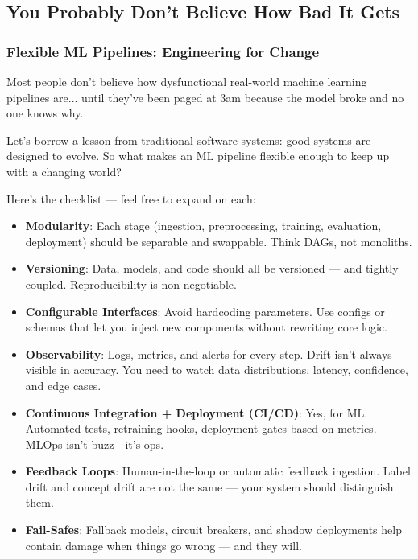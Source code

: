 \subsection{You Probably Don’t Believe How Bad It Gets}

\subsubsection{Flexible ML Pipelines: Engineering for Change}

Most people don’t believe how dysfunctional real-world machine learning pipelines are...  until they’ve been paged at 3am because the model broke and no one knows why.


Let’s borrow a lesson from traditional software systems: good systems are designed to evolve. So what makes an ML pipeline flexible enough to keep up with a changing world?

Here’s the checklist — feel free to expand on each:

\begin{itemize}
    \item \textbf{Modularity}: Each stage (ingestion, preprocessing, training, evaluation, deployment) should be separable and swappable. Think DAGs, not monoliths.

    \item \textbf{Versioning}: Data, models, and code should all be versioned — and tightly coupled. Reproducibility is non-negotiable.

    \item \textbf{Configurable Interfaces}: Avoid hardcoding parameters. Use configs or schemas that let you inject new components without rewriting core logic.

    \item \textbf{Observability}: Logs, metrics, and alerts for every step. Drift isn’t always visible in accuracy. You need to watch data distributions, latency, confidence, and edge cases.

    \item \textbf{Continuous Integration + Deployment (CI/CD)}: Yes, for ML. Automated tests, retraining hooks, deployment gates based on metrics. MLOps isn’t buzz—it’s ops.

    \item \textbf{Feedback Loops}: Human-in-the-loop or automatic feedback ingestion. Label drift and concept drift are not the same — your system should distinguish them.

    \item \textbf{Fail-Safes}: Fallback models, circuit breakers, and shadow deployments help contain damage when things go wrong — and they will.
\end{itemize}


